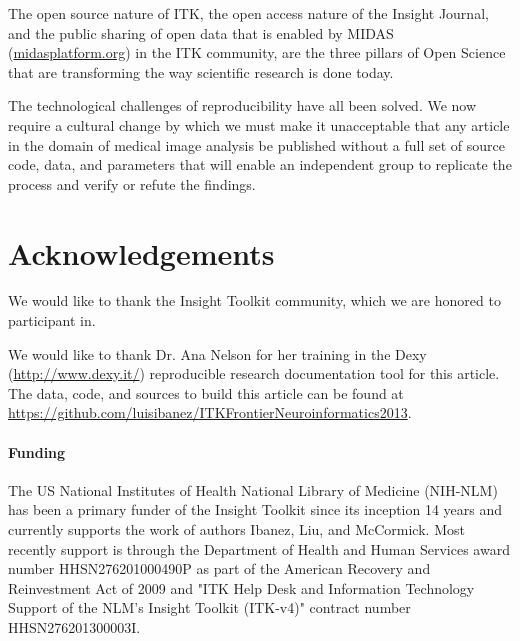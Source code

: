 \documentclass{frontiersENG} %
\begin{document}
The open source nature of ITK, the open access nature of the Insight Journal,
and the public sharing of open data that is enabled by MIDAS
(\url{midasplatform.org}) in the ITK community, are the three pillars of Open
Science that are transforming the way scientific research is done today.

The technological challenges of reproducibility have all been solved. We now
require a cultural change by which we must make it unacceptable that any
article in the domain of medical image analysis be published without a full
set of source code, data, and parameters that will enable an independent group
to replicate the process and verify or refute the findings.

\section*{Acknowledgements}

We would like to thank the Insight Toolkit community, which we are honored to
participant in.

We would like to thank Dr. Ana Nelson for her training in the Dexy
(\url{http://www.dexy.it/}) reproducible research documentation tool for this
article.  The data, code, and sources to build this article can be found at
\url{https://github.com/luisibanez/ITKFrontierNeuroinformatics2013}.

\paragraph{Funding\textcolon} The US National Institutes of Health National
Library of Medicine (NIH-NLM) has been a primary funder of the Insight Toolkit since
its inception 14 years and currently supports the work of authors Ibanez, Liu,
and McCormick. Most recently support is through the Department of Health and Human
Services award number HHSN276201000490P as part of the American Recovery and
Reinvestment Act of 2009 and "ITK Help Desk and Information Technology Support
of the NLM's Insight Toolkit (ITK-v4)" contract number HHSN276201300003I.















\end{document}
